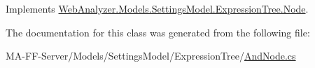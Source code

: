 Implements \hyperlink{class_web_analyzer_1_1_models_1_1_settings_model_1_1_expression_tree_1_1_node_a5cf0b866812c017ef1d0feb5f594499e}{Web\+Analyzer.\+Models.\+Settings\+Model.\+Expression\+Tree.\+Node}.



The documentation for this class was generated from the following file\+:\begin{DoxyCompactItemize}
\item 
M\+A-\/\+F\+F-\/\+Server/\+Models/\+Settings\+Model/\+Expression\+Tree/\hyperlink{_and_node_8cs}{And\+Node.\+cs}\end{DoxyCompactItemize}
